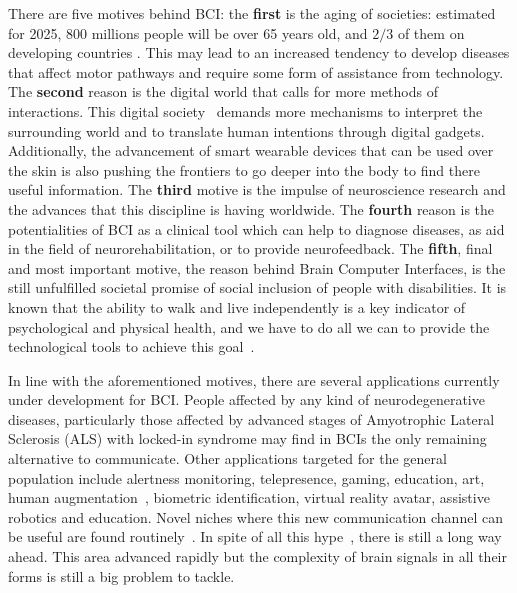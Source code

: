 
There are five motives behind BCI: the \textbf{first} is the aging of societies: estimated for 2025, 800 millions people will be over 65 years old, and $2/3$ of them on developing countries \cite{Lloyd-Sherlock2000}.  This may lead to an increased tendency to develop diseases that affect motor pathways and require some form of assistance from technology.  The \textbf{second} reason is the digital world that calls for more methods of interactions. This digital society~\cite{Dyson1998} demands more mechanisms to interpret the surrounding world and to translate human intentions through digital gadgets.  Additionally, the advancement of smart wearable devices that can be used over the skin is also pushing the frontiers to go deeper into the body to find there useful information.  The \textbf{third} motive is the impulse of neuroscience research and the advances that this discipline is having worldwide.  The \textbf{fourth} reason is the potentialities of BCI as a clinical tool which can help to diagnose diseases, as aid in the field of neurorehabilitation,  or to provide neurofeedback.  The \textbf{fifth}, final and most important motive, the reason behind Brain Computer Interfaces, is the still unfulfilled societal promise of social inclusion of people with disabilities.  It is known that the ability to walk and live independently is a key indicator of psychological and physical health, and we have to do all we can to provide the technological tools to achieve this goal~\cite{Rao2013,Clerc2016,WolpawJonathanR2012,Huggins2015}. 

In line with the aforementioned motives, there are several applications currently under development for BCI.  People affected by any kind of neurodegenerative diseases, particularly those affected by advanced stages of Amyotrophic Lateral Sclerosis (ALS) with locked-in syndrome may find in BCIs the only remaining alternative to communicate. Other applications targeted for the general population include alertness monitoring, telepresence, gaming, education, art, human augmentation~\cite{Yuste2017}, biometric identification, virtual reality avatar, assistive robotics and education.  Novel niches where this new communication channel can be useful are found routinely~\cite{Nam2018}. In spite of all this hype~\cite{GartnerHype2016}, there is still a long way ahead.  This area advanced rapidly but the complexity of brain signals in all their forms is still a big problem to tackle.  

